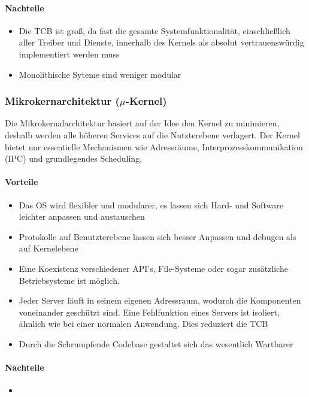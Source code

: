 \documentclass{article}
\begin{document}
\paragraph{Nachteile}
\begin{itemize}
   \item Die TCB ist groß, da fast die gesamte Systemfunktionalität, einschließlich aller Treiber und Dienste, innerhalb des Kernels als absolut vertrauenswürdig implementiert werden muss
   \item Monolithische Syteme sind weniger modular
\end{itemize}

\subsubsection*{Mikrokernarchitektur ($\mu$-Kernel)}

\noindent
Die Mikrokernalarchitektur basiert auf der Idee den Kernel zu minimieren, deshalb werden alle höheren Services auf die Nutzterebene verlagert. Der Kernel bietet nur essentielle Mechanismen wie Adressräume, Interprozesskommunikation (IPC) und grundlegendes Scheduling,
\paragraph{Vorteile}
\begin{itemize}
   \item Das OS wird flexibler und modularer, es lassen sich Hard- und Software leichter anpassen und austauschen
   \item Protokolle auf Benutzterebene lassen sich besser Anpassen und debugen als auf Kernelebene 
   \item Eine Koexistenz verschiedener API's, File-Systeme oder sogar zusätzliche Betriebsysteme ist möglich.
   \item Jeder Server läuft in seinem eigenen Adressraum, wodurch die Komponenten voneinander geschützt sind. Eine Fehlfunktion eines Servers ist isoliert, ähnlich wie bei einer normalen Anwendung. Dies reduziert die TCB
   \item Durch die Schrumpfende Codebase gestaltet sich das wesentlich Wartbarer
\end{itemize}

\paragraph{Nachteile}
\begin{itemize}
   \item
\end{itemize}
\end{document}
